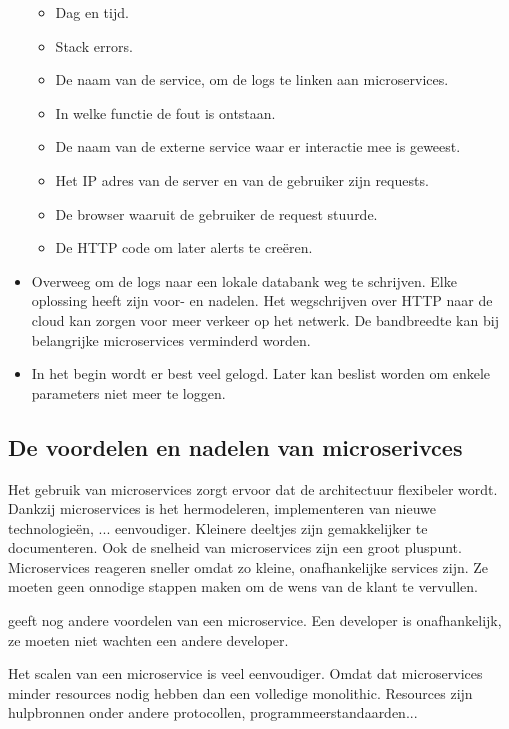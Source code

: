 \begin{itemize}
		\begin{itemize}
			\item Dag en tijd.
			\item Stack errors.
			\item De naam van de service, om de logs te linken aan microservices.
			\item In  welke functie de fout is ontstaan.
			\item De naam van de externe service waar er interactie mee is geweest.
			\item Het IP adres van de server en van de gebruiker zijn requests. 
			\item De browser waaruit de gebruiker de request stuurde.
			\item De HTTP code om later alerts te creëren. 
		\end{itemize}
	\item Overweeg om de logs naar een lokale databank  weg te schrijven. Elke oplossing heeft zijn voor- en nadelen. Het  wegschrijven over HTTP naar de cloud kan zorgen voor meer verkeer op het netwerk. De bandbreedte kan bij belangrijke microservices verminderd worden. 
	\item In het begin wordt er best veel gelogd. Later kan beslist worden om enkele parameters niet meer te loggen.
\end{itemize}



\subsection{De voordelen en nadelen van microserivces}
Het gebruik van microservices zorgt ervoor dat de architectuur flexibeler wordt.  Dankzij microservices is het hermodeleren, implementeren van nieuwe  technologieën, ... eenvoudiger.
Kleinere deeltjes zijn gemakkelijker te documenteren. Ook de snelheid van microservices zijn een groot pluspunt. Microservices reageren sneller  omdat zo kleine, onafhankelijke services zijn. Ze moeten geen onnodige stappen maken om de  wens van de klant te vervullen. 

\textcite{Watts2018} geeft nog andere voordelen van een microservice. Een developer is onafhankelijk, ze moeten niet wachten een andere developer. 

Het scalen van een microservice is veel eenvoudiger. Omdat dat microservices minder resources nodig hebben dan een volledige monolithic. Resources zijn hulpbronnen onder andere protocollen, programmeerstandaarden... 

